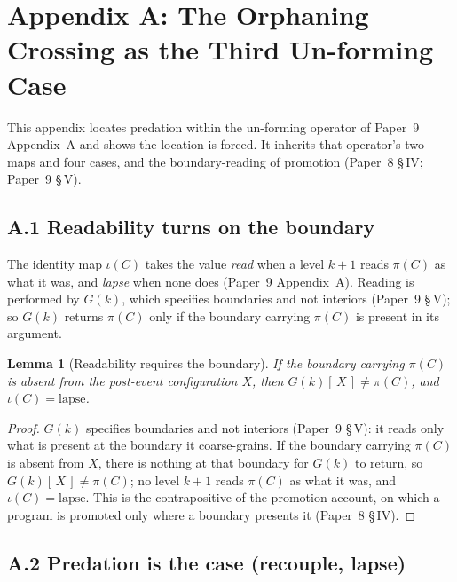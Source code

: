 \documentclass[11pt,oneside]{report}
\newtheorem{lemma}[theorem]{Lemma}
\theoremstyle{definition}
\theoremstyle{remark}
\begin{document}
\section*{Appendix A: The Orphaning Crossing as the Third Un-forming Case}

This appendix locates predation within the un-forming operator of Paper~9 Appendix~A and shows the location is forced. It inherits that operator's two maps and four cases, and the boundary-reading of promotion (Paper~8 \S\,IV; Paper~9 \S\,V).

\subsection*{A.1 Readability turns on the boundary}

The identity map \ensuremath{\iota(C)} takes the value \emph{read} when a level \ensuremath{k{+}1} reads \ensuremath{\pi(C)} as what it was, and \emph{lapse} when none does (Paper~9 Appendix~A). Reading is performed by \ensuremath{G(k)}, which specifies boundaries and not interiors (Paper~9 \S\,V); so \ensuremath{G(k)} returns \ensuremath{\pi(C)} only if the boundary carrying \ensuremath{\pi(C)} is present in its argument.

\begin{lemma}[Readability requires the boundary]
If the boundary carrying \ensuremath{\pi(C)} is absent from the post-event configuration \ensuremath{X}, then \ensuremath{G(k)[\,X\,] \neq \pi(C)}, and \ensuremath{\iota(C) = \text{lapse}}.
\end{lemma}

\begin{proof}
\ensuremath{G(k)} specifies boundaries and not interiors (Paper~9 \S\,V): it reads only what is present at the boundary it coarse-grains. If the boundary carrying \ensuremath{\pi(C)} is absent from \ensuremath{X}, there is nothing at that boundary for \ensuremath{G(k)} to return, so \ensuremath{G(k)[\,X\,] \neq \pi(C)}; no level \ensuremath{k{+}1} reads \ensuremath{\pi(C)} as what it was, and \ensuremath{\iota(C) = \text{lapse}}. This is the contrapositive of the promotion account, on which a program is promoted only where a boundary presents it (Paper~8 \S\,IV).
\end{proof}

\subsection*{A.2 Predation is the case (recouple, lapse)}
\end{document}
